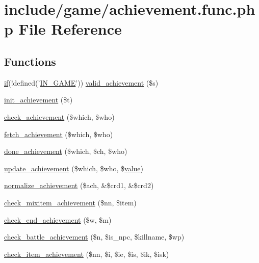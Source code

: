 \hypertarget{achievement_8func_8php}{\section{include/game/achievement.func.\+php File Reference}
\label{achievement_8func_8php}
}
\subsection*{Functions}
\begin{DoxyCompactItemize}
\item 
\hyperlink{login__old_8php_a4ac1118c2e44c513a674bc1793ba6c90}{if}(!defined('\hyperlink{templates_2install_8php_a12c82f3d28569a3f80804f1e72cef14c}{I\+N\+\_\+\+G\+A\+M\+E}')) \hyperlink{achievement_8func_8php_ac7f448e61b96ff060ce1bddaf1826f77}{valid\+\_\+achievement} (\$s)
\item 
\hyperlink{achievement_8func_8php_a09acfb1c7932bd819170405446caba8d}{init\+\_\+achievement} (\$t)
\item 
\hyperlink{achievement_8func_8php_a29cf84d29736235a81f2ddc975c65b2f}{check\+\_\+achievement} (\$which, \$who)
\item 
\hyperlink{achievement_8func_8php_ab074f894877dd8923b216ea2c32ac743}{fetch\+\_\+achievement} (\$which, \$who)
\item 
\hyperlink{achievement_8func_8php_a89c3896514a4c99207e24eea21c66b08}{done\+\_\+achievement} (\$which, \$ch, \$who)
\item 
\hyperlink{achievement_8func_8php_a118e50238d06e8d6d8479d5247d50b24}{update\+\_\+achievement} (\$which, \$who, \$\hyperlink{1__chat_8tpl_8php_afcc7a4b78ecd8fa7e713f8cfa0f51017}{value})
\item 
\hyperlink{achievement_8func_8php_a8def62e7f0068e6bed52ce93aaf0435e}{normalize\+\_\+achievement} (\$ach, \&\$crd1, \&\$crd2)
\item 
\hyperlink{achievement_8func_8php_a755ee55271f67ed6f935f7c0cfca5250}{check\+\_\+mixitem\+\_\+achievement} (\$nn, \$item)
\item 
\hyperlink{achievement_8func_8php_acbd01e17fe7f60ce9e70a1723bff45b2}{check\+\_\+end\+\_\+achievement} (\$w, \$m)
\item 
\hyperlink{achievement_8func_8php_a9e31f8a8d7f385f8f02ea9fa52af641b}{check\+\_\+battle\+\_\+achievement} (\$n, \$is\+\_\+npc, \$killname, \$wp)
\item 
\hyperlink{achievement_8func_8php_a0e4e9dcee1ab0b09d7d5af669df78407}{check\+\_\+item\+\_\+achievement} (\$nn, \$i, \$ie, \$is, \$ik, \$isk)
\end{DoxyCompactItemize}



